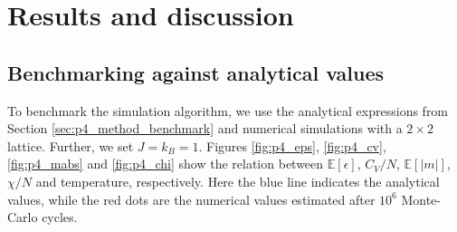 \documentclass[../main_proj4_correct_template.tex]{subfiles}
\begin{document}
\section{Results and discussion}\label{sec:p4_results_and_discussion}

\subsection{Benchmarking against analytical values}

To benchmark the simulation algorithm, we use the analytical expressions from Section \ref{sec:p4_method_benchmark} and numerical simulations with a $2\times 2$ lattice. Further, we set $J=k_B=1$. Figures \ref{fig:p4_eps}, \ref{fig:p4_cv}, \ref{fig:p4_mabs} and \ref{fig:p4_chi} show the relation between $\mathbb{E}[\epsilon]$, $C_V/N$, $\mathbb{E}[|m|]$, $\chi/N$ and temperature, respectively. Here the blue line indicates the analytical values, while the red dots are the numerical values estimated after $10^{6}$ Monte-Carlo cycles.
\end{document}
